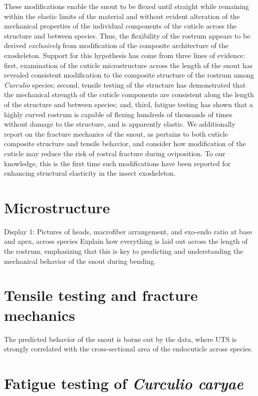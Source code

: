 \documentclass[twocolumn, linenumbers, superscriptaddress]{revtex4-1}
\begin{document}
	These modifications enable the snout to be flexed until straight while remaining within the elastic limits of the material and without evident alteration of the mechanical properties of the individual components of the cuticle across the structure and between species.
	Thus, the flexibility of the rostrum appears to be derived \emph{exclusively} from modification of the composite architecture of the exoskeleton.
	Support for this hypothesis has come from three lines of evidence: first, examination of the cuticle microstructure across the length of the snout has revealed consistent modification to the composite structure of the rostrum among \textit{Curculio} species; second, tensile testing of the structure has demonstrated that the mechanical strength of the cuticle components are consistent along the length of the structure and between species; and, third, fatigue testing has shown that a highly curved rostrum is capable of flexing hundreds of thousands of times without damage to the structure, and is apparently elastic.
	We additionally report on the fracture mechanics of the snout, as pertains to both cuticle composite structure and tensile behavior, and consider how modification of the cuticle may reduce the risk of rostral fracture during oviposition.
	To our knowledge, this is the first time such modifications have been reported for enhancing structural elasticity in the insect exoskeleton.

	\section*{Microstructure}\label{sec:microstructure} 
		Display 1: Pictures of heads, macrofiber arrangement, and exo-endo ratio at base and apex, across species
		Explain how everything is laid out across the length of the rostrum, emphasizing that this is key to predicting and understanding the mechanical behavior of the snout during bending.
	
	\section*{Tensile testing and fracture mechanics}
		The predicted behavior of the snout is borne out by the data, where UTS is strongly correlated with the cross-sectional area of the endocuticle across species.
		
	\section*{Fatigue testing of \textit{Curculio caryae}}
\end{document}
